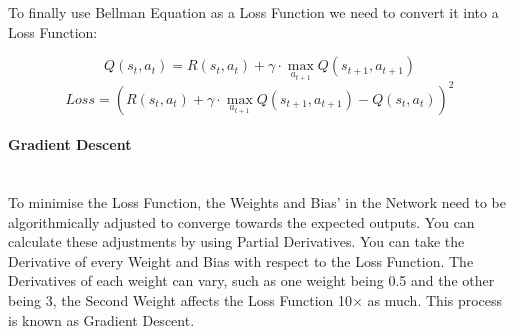 \begin{flushleft}
                    To finally use Bellman Equation as a Loss Function we need to convert it into a Loss Function: \\
                    \vspace{0.2cm}

                    \[Q(s_t, a_t) = R(s_t, a_t) + \gamma \cdot \max_{a_{t+1}} Q(s_{t+1}, a_{t+1})\]
                    \[Loss = \left( R(s_t, a_t) + \gamma \cdot \max_{a_{t+1}} Q(s_{t+1}, a_{t+1}) - Q(s_t, a_t) \right)^2\]

                \paragraph{Gradient Descent} \mbox{} \\ 
                    \vspace{0.2cm}   
                    To minimise the Loss Function, the Weights and Bias' in the Network need to be algorithmically adjusted to converge towards the expected outputs. You can
                    calculate these adjustments by using Partial Derivatives. You can take the Derivative of every Weight and Bias with respect to the Loss Function. The Derivatives
                    of each weight can vary, such as one weight being 0.5 and the other being 3, the Second Weight affects the Loss Function 10$\times$ as much. This process is
                    known as Gradient Descent. \\


\end{flushleft}
